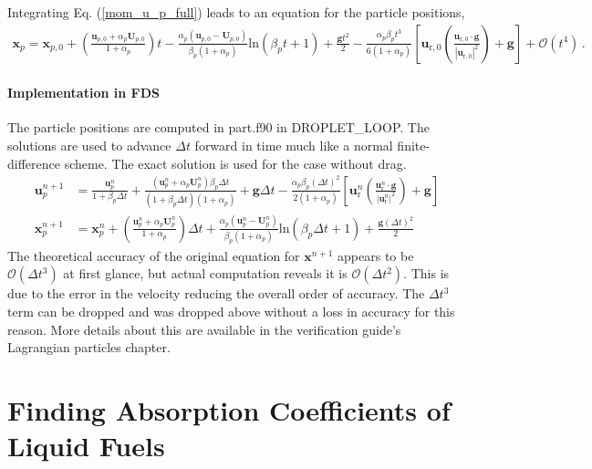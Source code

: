 Integrating Eq. (\ref{mom_u_p_full}) leads to an equation for the particle positions,
\begin{align}
    \label{mom_x_p_full}
    \mathbf{x}_p = \mathbf{x}_{p,0} + \left(\frac{\mathbf{u}_{p,0} + \alpha_p \mathbf{U}_{p,0}}{1 + \alpha_p}\right) t - \frac{\alpha_p (\mathbf{u}_{p,0} - \mathbf{U}_{p,0})}{\beta_p (1 + \alpha_p)} \text{ln}(\beta_p t + 1) + \frac{\mathbf{g} t^2}{2} - \frac{\alpha_p \beta_p t^3}{6 (1 + \alpha_p)} \left[\mathbf{u}_{\text{r},0} \left(\frac{\mathbf{u}_{\text{r},0} \cdot \mathbf{g}}{|\mathbf{u}_{\text{r},0}|^2}\right) + \mathbf{g}\right] + \mathcal{O}(t^4) \,.
\end{align}
\subsubsection{Implementation in FDS}
The particle positions are computed in {\ct part.f90} in {\ct DROPLET\_LOOP}. The solutions are used to advance $\Delta t$ forward in time much like a normal finite-difference scheme. The exact solution is used for the case without drag.
\begin{align}
    \mathbf{u}_p^{n+1} &= \frac{\mathbf{u}_p^n}{1 + \beta_p \Delta t} + \frac{(\mathbf{u}_p^n + \alpha_p \mathbf{U}_p^n)\beta_p \Delta t}{(1 + \beta_p \Delta t)(1 + \alpha_p)} + \mathbf{g} \Delta t - \frac{\alpha_p \beta_p (\Delta t)^2}{2 (1 + \alpha_p)} \left[\mathbf{u}_\text{r}^n \left(\frac{\mathbf{u}_\text{r}^n \cdot \mathbf{g}}{|\mathbf{u}_\text{r}^n|^2}\right) + \mathbf{g}\right] \\[1cm]
    \mathbf{x}_p^{n+1} &= \mathbf{x}_p^n + \left(\frac{\mathbf{u}_p^n + \alpha_p \mathbf{U}_p^n}{1 + \alpha_p}\right) \Delta t + \frac{\alpha_p (\mathbf{u}_p^n - \mathbf{U}_p^n)}{\beta_p (1 + \alpha_p)} \text{ln}(\beta_p \Delta t + 1) + \frac{\mathbf{g} (\Delta t)^2}{2}
\end{align}
The theoretical accuracy of the original equation for $\mathbf{x}^{n+1}$ appears to be $\mathcal{O}(\Delta t^3)$ at first glance, but actual computation reveals it is $\mathcal{O}(\Delta t^2)$. This is due to the error in the velocity reducing the overall order of accuracy. The $\Delta t^3$ term can be dropped and was dropped above without a loss in accuracy for this reason. More details about this are available in the verification guide's Lagrangian particles chapter.

\chapter{Finding Absorption Coefficients of Liquid Fuels}
\label{app_abscoeff}

